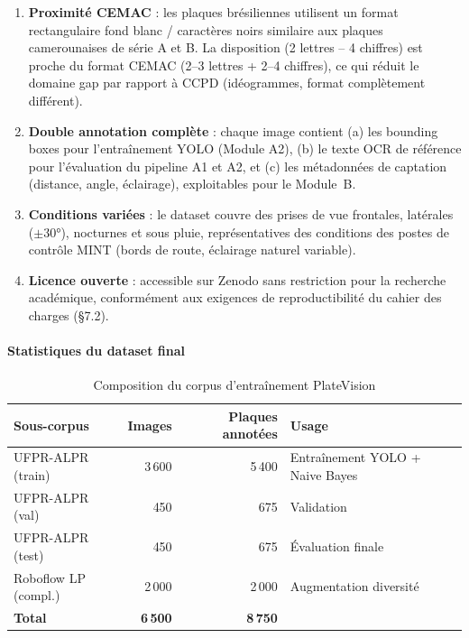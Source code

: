 \documentclass[12pt,a4paper]{article}
\begin{document}
\begin{enumerate}
  \item \textbf{Proximit\'{e} CEMAC} : les plaques br\'{e}siliennes utilisent
        un format rectangulaire fond blanc / caract\`{e}res noirs similaire
        aux plaques camerounaises de s\'{e}rie A et B. La disposition
        (2 lettres -- 4 chiffres) est proche du format CEMAC
        (2--3 lettres + 2--4 chiffres), ce qui r\'{e}duit le domaine gap
        par rapport \`{a} CCPD (id\'{e}ogrammes, format compl\`{e}tement diff\'{e}rent).

  \item \textbf{Double annotation compl\`{e}te} : chaque image contient
        (a) les bounding boxes pour l'entra\^{i}nement YOLO (Module A2),
        (b) le texte OCR de r\'{e}f\'{e}rence pour l'\'{e}valuation du pipeline
        A1 et A2, et (c) les m\'{e}tadonn\'{e}es de captation (distance, angle,
        \'{e}clairage), exploitables pour le Module~B.

  \item \textbf{Conditions vari\'{e}es} : le dataset couvre des prises de vue
        frontales, lat\'{e}rales ($\pm 30°$), nocturnes et sous pluie,
        repr\'{e}sentatives des conditions des postes de contr\^{o}le MINT
        (bords de route, \'{e}clairage naturel variable).

  \item \textbf{Licence ouverte} : accessible sur Zenodo sans restriction pour
        la recherche acad\'{e}mique, conform\'{e}ment aux exigences de
        reproductibilit\'{e} du cahier des charges (§7.2).
\end{enumerate}

\paragraph{Statistiques du dataset final}
\begin{table}[H]
\centering
\caption{Composition du corpus d'entra\^{i}nement PlateVision}
\label{tab:dsd:stats}
\begin{tabular}{lrrl}
\toprule
\textbf{Sous-corpus} & \textbf{Images} & \textbf{Plaques annot\'{e}es} & \textbf{Usage} \\
\midrule
UFPR-ALPR (train)   & 3\,600 & 5\,400 & Entra\^{i}nement YOLO + Naive Bayes \\
UFPR-ALPR (val)     &   450  &   675  & Validation \\
UFPR-ALPR (test)    &   450  &   675  & \'{E}valuation finale \\
Roboflow LP (compl.) & 2\,000 & 2\,000 & Augmentation diversit\'{e} \\
\midrule
\textbf{Total}       & \textbf{6\,500} & \textbf{8\,750} & \\
\bottomrule
\end{tabular}
\end{table}
\end{document}

